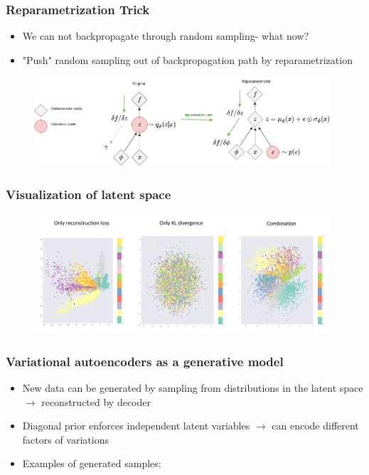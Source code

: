 
\begin{frame}
\frametitle{Reparametrization Trick}

\begin{itemize}
\item We can not backpropagate through random sampling- what now?
\pause
\item "Push" random sampling out of backpropagation path by reparametrization
\end{itemize}  

                \begin{figure}
                \centering
                \includegraphics[width=11cm]{plots/vae_reparam.png}
                \end{figure}
                
\end{frame}


\begin{frame}
\frametitle{Visualization of latent space}

\vspace{3mm}

                \begin{figure}
                \centering
                \includegraphics[width=11cm]{plots/vae_visualization.png}
                \end{figure}

\end{frame}


\begin{frame}
\frametitle{Variational autoencoders as a generative model}

\begin{itemize}
\item New data can be generated by sampling from distributions in the latent space $\rightarrow$ reconstructed by decoder
\pause
\item Diagonal prior enforces independent latent variables $\rightarrow$ can encode different factors of variations
\pause
\item Examples of generated samples:

\end{itemize}  
\end{frame}

